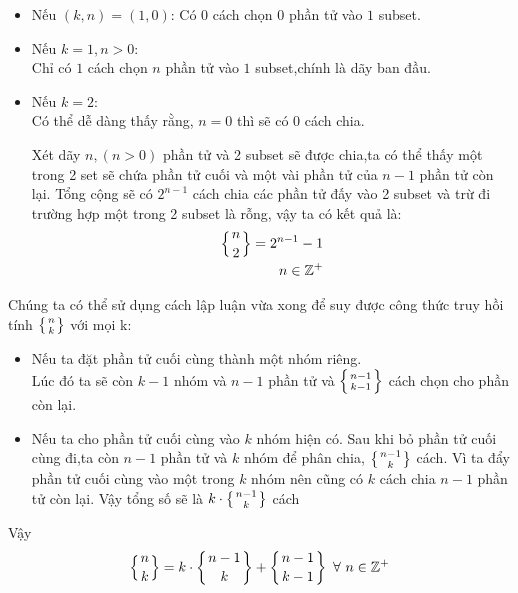 \begin{itemize}
    \item Nếu $(k,n) = (1,0)$: Có $0$ cách chọn $0$ phần tử vào $1$ subset. 
    \item Nếu $k = 1,n > 0$: 
            \\Chỉ có $1$ cách chọn $n$ phần tử vào $1$ subset,chính là dãy ban đầu.
    \item Nếu $k = 2$: \\
        Có thể dễ dàng thấy rằng, $n = 0$ thì sẽ có $0$ cách chia. 

        Xét dãy $n,(n > 0)$ phần tử và 2 subset sẽ được chia,ta có thể thấy 
        một trong 2 set sẽ chứa phần tử cuối và một vài phần tử của $n - 1$ phần tử 
        còn lại. Tổng cộng sẽ có $2^{n - 1}$ cách chia các phần tử đấy vào 2 subset 
        và trừ đi trường hợp một trong 2 subset là rỗng, vậy ta có kết quả là:
        \begin{equation}
            \begin{aligned}
                \left \{ {n \atop 2} \right \} = 2^{n - 1} - 1 \\
                n \in \mathbb{Z^+}
            \end{aligned} \label{eq:6.2}
        \end{equation}
\end{itemize}

\indent
Chúng ta có thể sử dụng cách lập luận vừa xong để suy được công thức truy hồi tính 
$\left \{ {n \atop k} \right \}$ với mọi k:
    \begin{itemize}
        \item Nếu ta đặt phần tử cuối cùng thành một nhóm riêng. \\
            Lúc đó ta sẽ còn $k - 1$ nhóm và $n - 1$ phần tử và
            $\left \{ {n - 1 \atop k - 1} \right \}$ cách chọn cho phần còn lại.
        \item Nếu ta cho phần tử cuối cùng vào $k$ nhóm hiện có.
            Sau khi bỏ phần tử cuối cùng đi,ta còn $n - 1$ phần tử và $k$ nhóm để 
            phân chia, $\left \{ {n - 1 \atop k} \right \}$ cách. Vì ta đẩy phần tử 
            cuối cùng vào một trong $k$ nhóm nên cũng có $k$ cách 
            chia $n - 1$ phần tử còn lại. Vậy tổng số sẽ là 
            $k \cdot \left \{ {n - 1 \atop k} \right \}$ cách
    \end{itemize}
Vậy
\begin{equation}
    \begin{aligned}
        \left \{ {n \atop k} \right \} = 
        k \cdot \left \{ {n - 1 \atop k} \right \} + 
        \left \{ {n -1 \atop k - 1} \right \} \
        \forall \  n \in \mathbb{Z^+}
    \end{aligned} \label{eq:6.3}
\end{equation}

